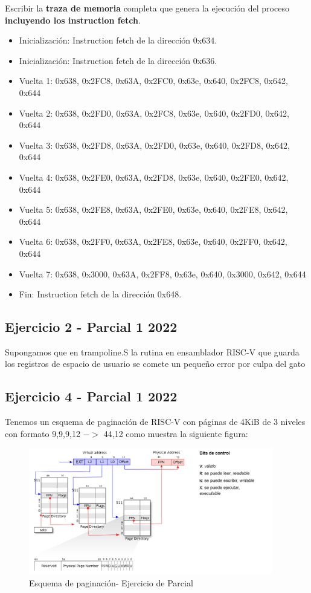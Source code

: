 \documentclass{article}
\begin{document}
Escribir la \textbf{traza de memoria} completa que genera la ejecución del proceso \textbf{incluyendo los instruction fetch}.

\begin{itemize}
    \item Inicialización: Instruction fetch de la dirección 0x634.
    \item Inicialización: Instruction fetch de la dirección 0x636.
    \item Vuelta 1: 0x638, 0x2FC8, 0x63A, 0x2FC0, 0x63e, 0x640, 0x2FC8, 0x642, 0x644
    \item Vuelta 2: 0x638, 0x2FD0, 0x63A, 0x2FC8, 0x63e, 0x640, 0x2FD0, 0x642, 0x644
    \item Vuelta 3: 0x638, 0x2FD8, 0x63A, 0x2FD0, 0x63e, 0x640, 0x2FD8, 0x642, 0x644
    \item Vuelta 4: 0x638, 0x2FE0, 0x63A, 0x2FD8, 0x63e, 0x640, 0x2FE0, 0x642, 0x644
    \item Vuelta 5: 0x638, 0x2FE8, 0x63A, 0x2FE0, 0x63e, 0x640, 0x2FE8, 0x642, 0x644
    \item Vuelta 6: 0x638, 0x2FF0, 0x63A, 0x2FE8, 0x63e, 0x640, 0x2FF0, 0x642, 0x644
    \item Vuelta 7: 0x638, 0x3000, 0x63A, 0x2FF8, 0x63e, 0x640, 0x3000, 0x642, 0x644
    \item Fin: Instruction fetch de la dirección 0x648.
\end{itemize}

\subsection{Ejercicio 2 - Parcial 1 2022}
Supongamos que en trampoline.S la rutina en ensamblador RISC-V que guarda los registros de espacio de usuario se comete un pequeño error por culpa del gato

\newpage
\subsection{Ejercicio 4 - Parcial 1 2022}
Tenemos un esquema de paginación de RISC-V con páginas de 4KiB de 3 niveles con formato 9,9,9,12 $->$ 44,12 como muestra la siguiente figura:

\begin{figure}[h]
    \centering
    \includegraphics[width=0.95\textwidth]{src/ej4.png}
    \caption{Esquema de paginación- Ejercicio de Parcial}
\end{figure}
\end{document}
